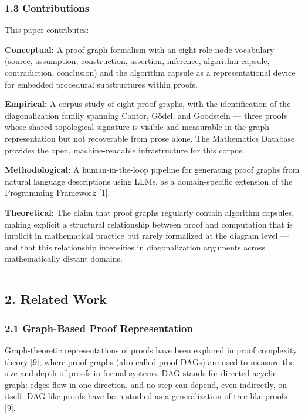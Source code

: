 \documentclass[
  11pt]{article}
\begin{document}
\hypertarget{13-contributions}{%
\subsubsection{1.3 Contributions}\label{13-contributions}}

This paper contributes:

\textbf{Conceptual:} A proof-graph formalism with an eight-role node
vocabulary (source, assumption, construction, assertion, inference,
algorithm capsule, contradiction, conclusion) and the algorithm capsule
as a representational device for embedded procedural substructures
within proofs.

\textbf{Empirical:} A corpus study of eight proof graphs, with the
identification of the diagonalization family spanning Cantor, Gödel, and
Goodstein --- three proofs whose shared topological signature is visible
and measurable in the graph representation but not recoverable from
prose alone. The Mathematics Database provides the open,
machine-readable infrastructure for this corpus.

\textbf{Methodological:} A human-in-the-loop pipeline for generating
proof graphs from natural language descriptions using LLMs, as a
domain-specific extension of the Programming Framework {[}1{]}.

\textbf{Theoretical:} The claim that proof graphs regularly contain
algorithm capsules, making explicit a structural relationship between
proof and computation that is implicit in mathematical practice but
rarely formalized at the diagram level --- and that this relationship
intensifies in diagonalization arguments across mathematically distant
domains.

\begin{center}\rule{0.5\linewidth}{0.5pt}\end{center}

\hypertarget{2-related-work}{%
\subsection{2. Related Work}\label{2-related-work}}

\hypertarget{21-graph-based-proof-representation}{%
\subsubsection{2.1 Graph-Based Proof
Representation}\label{21-graph-based-proof-representation}}

Graph-theoretic representations of proofs have been explored in proof
complexity theory {[}9{]}, where proof graphs (also called proof DAGs)
are used to measure the size and depth of proofs in formal systems. DAG
stands for directed acyclic graph: edges flow in one direction, and no
step can depend, even indirectly, on itself. DAG-like proofs have been
studied as a generalization of tree-like proofs {[}9{]}.
\end{document}
